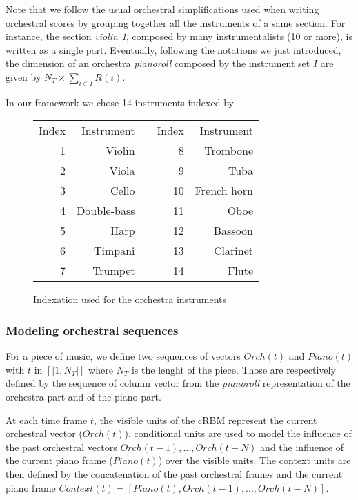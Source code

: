 \documentclass[letterpaper]{article}
\begin{document}
Note that we follow the usual orchestral simplifications used when writing orchestral scores by grouping together all the instruments of a same section. For instance, the section \textit{violin 1}, composed by many instrumentalists (10 or more), is written as a single part.
Eventually, following the notations we just introduced, the dimension of an orchestra \textit{pianoroll} composed by the instrument set $I$ are given by $N_{T} \times \sum_{i \in I} R(i)$.

In our framework we chose 14 instruments indexed by 
\begin{figure}
\begin{center}
\begin{tabular}{|r|r|c|r|r|}
\cline{1-2}
\cline{4-5}
\rule{0pt}{2.5ex} Index & Instrument & & Index & Instrument\\
\cline{1-2}
\cline{4-5}
\rule{0pt}{2.5ex} 1 & Violin & & 8 & Trombone\\
2 & Viola & & 9 & Tuba\\
3 & Cello &  & 10 & French horn\\
4 & Double-bass & & 11 & Oboe\\
5 & Harp & & 12 & Bassoon\\
6 & Timpani & & 13 & Clarinet\\
7 & Trumpet & & 14 & Flute\\
\cline{1-2}
\cline{4-5}
\end{tabular}
\end{center}
\caption{Indexation used for the orchestra instruments}
\end{figure}

\subsubsection{Modeling orchestral sequences}
For a piece of music, we define two sequences of vectors $Orch(t)$ and $Piano(t)$ with $t$ in $\left[ | 1 , N_{T} | \right]$ where $N_{T}$ is the lenght of the piece. Those are respectively defined by the sequence of column vector from the \textit{pianoroll} representation of the orchestra part and of the piano part.

At each time frame $t$, the visible units of the cRBM represent the current orchestral vector ($Orch(t)$), conditional units are used to model the influence of the past orchestral vectors $Orch(t-1) , ... , Orch(t-N)$ and the influence of the current piano frame ($Piano(t)$) over the visible units. The context units are then defined by the concatenation of the past orchestral frames and the current piano frame
$ Context(t) = \left[ Piano(t) , Orch(t-1) , ... , Orch(t-N)\right]$.
\end{document}
